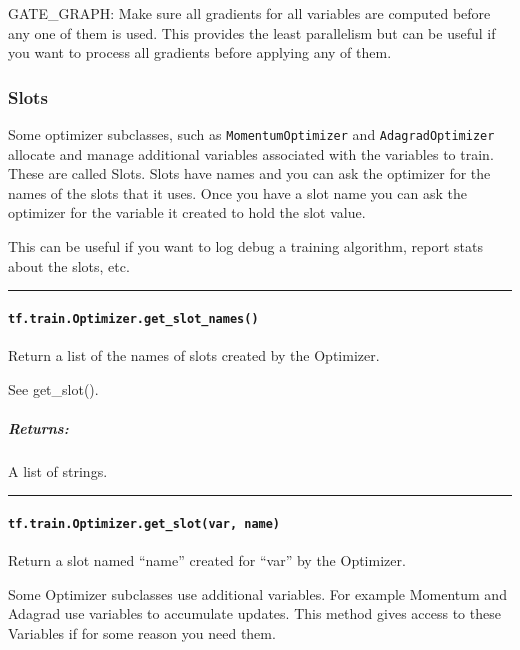 GATE\_GRAPH: Make sure all gradients for all variables are computed
before any one of them is used. This provides the least parallelism but
can be useful if you want to process all gradients before applying any
of them.

\subsubsection{Slots }\label{slots}

Some optimizer subclasses, such as \texttt{MomentumOptimizer} and
\texttt{AdagradOptimizer} allocate and manage additional variables
associated with the variables to train. These are called Slots. Slots
have names and you can ask the optimizer for the names of the slots that
it uses. Once you have a slot name you can ask the optimizer for the
variable it created to hold the slot value.

This can be useful if you want to log debug a training algorithm, report
stats about the slots, etc.

\begin{center}\rule{0.5\linewidth}{\linethickness}\end{center}

\paragraph{\texorpdfstring{\texttt{tf.train.Optimizer.get\_slot\_names()}
}{tf.train.Optimizer.get\_slot\_names() }}\label{tf.train.optimizer.getux5fslotux5fnames}

Return a list of the names of slots created by the Optimizer.

See get\_slot().

\subparagraph{Returns: }\label{returns-3}

A list of strings.

\begin{center}\rule{0.5\linewidth}{\linethickness}\end{center}

\paragraph{\texorpdfstring{\texttt{tf.train.Optimizer.get\_slot(var,\ name)}
}{tf.train.Optimizer.get\_slot(var, name) }}\label{tf.train.optimizer.getux5fslotvar-name}

Return a slot named ``name'' created for ``var'' by the Optimizer.

Some Optimizer subclasses use additional variables. For example Momentum
and Adagrad use variables to accumulate updates. This method gives
access to these Variables if for some reason you need them.

